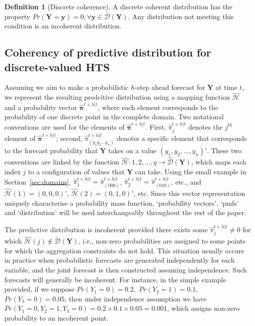\documentclass[a4paper,review,12pt,authoryear]{elsarticle}
\newcommand{\bY}{\mathbf{Y}}
\newcommand{\bpi}{\bm{\pi}}
\theoremstyle{definition}
\newtheorem{definition}{Definition}[section]
\begin{document}
  \begin{definition}[Discrete coherence]
  
  A discrete coherent distribution has the property $Pr(\mathbf{Y}=\bm{y})=0, \forall \bm{y}\in \bar{\mathcal D}(\bY)$. Any distribution not meeting this condition is an incoherent distribution.

  \end{definition}

  \subsection{Coherency of predictive distribution for discrete-valued HTS}

  \label{sec:coherent_df}

  Assuming we aim to make a probabilistic $h$-step ahead forecast for $\bY$ at time $t$, we represent the resulting predcitive distribution using a mapping function $\hat{\mathcal{H}}$ and a probability vector $\hat{\bpi}^{t+h|t}$, where each element corresponds to the probability of one discrete point in the complete domain.
  Two notational conventions are used for the elements of $\hat{\bpi}^{t+h|t}$.
  First, $\hat{\pi}_j^{t+h|t}$ denotes the $j^{th}$ element of $\hat{\bpi}^{t+h|t}$;
  second, $\hat{\pi}_{(y_1 y_2 \dots y_n)}^{t+h|t}$ denotes a specific element that corresponds to the forecast probability that $\bY$ takes on a value $(y_1,y_2,\dots,y_n)'$. These two conventions are linked by the function $\hat{\mathcal{H}}:{1,2,\dots,q}\rightarrow\hat{\mathcal{D}}(\bY)$, which maps each index $j$ to a configuration of values that $\bY$ can take.
  Using the small example in Section~\ref{sec:domains}, $\hat{\pi}_1^{t+h|t}=\hat{\pi}_{(000)}^{t+h|t}$, $\hat{\pi}_2^{t+h|t}=\hat{\pi}_{(010)}^{t+h|t}$, etc., and $\hat{\mathcal{H}}(1)=(0,0,0)'$, $\hat{\mathcal{H}}(2)=(0,1,0)'$, etc. Since this vector representation uniquely characterise a probability mass function, `probability vectors', `pmfs' and `distribution' will be used interchangeably throughout the rest of the paper.

  The predictive distribution is incoherent provided there exists some $\hat{\pi}^{t+h|t}_j\neq 0$ for which $\hat{\mathcal{H}}(j)\notin\tilde{\mathcal{D}}(\bY)$, i.e., non-zero probabilities are assigned to some points for which the aggregation constraints do not hold.
  This situation usually occurs in practice when probabilistic forecasts are generated independently for each variable, and the joint forecast is then constructed assuming independence.
  Such forecasts will generally be incoherent.
  For instance, in the simple example provided, if we suppose $Pr(Y_1=0)=0.2$,~$Pr(Y_2=1)=0.1$,~$Pr(Y_3=0)=0.05$, then under independence assumption we have $Pr(Y_1=0,Y_2=1,Y_3=0)=0.2\times0.1\times0.05=0.001$, which assigns non-zero probability to an incoherent point.
\end{document}
